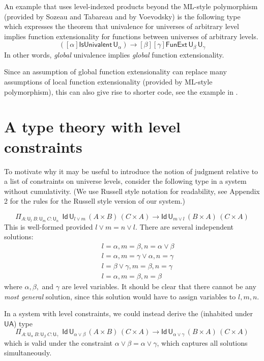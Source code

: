 \documentclass[a4paper,UKenglish,cleveref, autoref, thm-restate]{lipics-v2021}
\newcommand{\Id}{\mathsf{Id}}
\newcommand{\UU}{\mathsf{U}}
\newcommand{\UA}{\mathsf{UA}}
\begin{document}
An example that uses level-indexed products beyond the ML-style
polymorphism (provided by Sozeau and Tabareau and by Voevodsky)
is the following type which
expresses the theorem that univalence for universes of arbitrary level implies
function extensionality for functions between universes of arbitrary levels.
$$
([\alpha]\mathsf{IsUnivalent}\, \UU_\alpha)
\to [\beta][\gamma] \mathsf{FunExt}\, \UU_\beta\, \UU_\gamma
$$
In other words, {\em global} univalence implies {\em global} function 
extensionality.

Since an assumption of global function extensionality can replace many assumptions of local function extensionality (provided by ML-style polymorphism), this can also give rise to shorter code, see the example in \cite{escardo:UFinAgda}.


\section{A type theory with level constraints}\label{sec:constraints}

To motivate why it may be useful to introduce the notion of judgment relative to a list of constraints on universe levels, consider the following type in a system without cumulativity. (We use Russell style notation for readability, see Appendix 2 for the rules for the Russell style version of our system.)

$$
    \Pi_{A:\UU_l~{B}:{\UU_m}~{C}:{\UU_n}}
    {~~\Id\,\UU_{l \vee m}\, (A\times B)\,(C \times A)
    \to \Id\,\UU_{m \vee l} \, (B\times A)\,(C \times A)}
$$
This is well-formed provided $l \vee m = n \vee l$.
There are several independent solutions:
\begin{eqnarray*}
&&l = \alpha, m = \beta, n = \alpha \vee \beta\\
&&l = \alpha, m = \gamma \vee \alpha, n = \gamma\\
&&l = \beta \vee \gamma, m = \beta, n = \gamma\\
&&l = \alpha, m = \beta, n = \beta
\end{eqnarray*}
where $\alpha, \beta,$ and $\gamma$ are level
variables. It should be clear that there cannot be any {\em most general} solution, since this solution would have to
assign variables to $l,m,n$.


In a system with level constraints,
we could instead derive the (inhabited under $\UA$) type
$$
    \Pi_{A:\UU_\alpha~{B}:{\UU_\beta}~{C}:{\UU_\gamma}}
    {~~\Id\,\UU_{\alpha \vee \beta}\, (A\times B)\,(C \times A)
    \to \Id\,\UU_{\alpha \vee \gamma}\, (B\times A)\,(C \times A)}
$$
which is valid under the constraint
$\alpha \vee \beta = \alpha \vee \gamma$,
which captures all solutions simultaneously.
\end{document}
